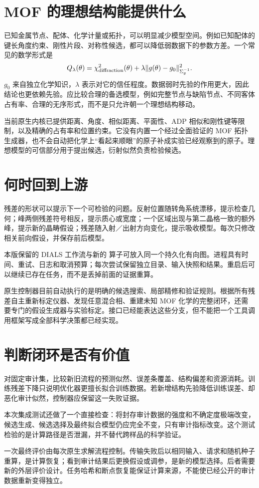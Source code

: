 \section{MOF 的理想结构能提供什么}
已知金属节点、配体、化学计量或拓扑，可以明显减少模型空间。例如已知配体的键长角度约束、刚性片段、对称性候选，都可以降低弱数据下的参数方差。一个常见的数学形式是
\begin{equation}
 Q_\lambda(\theta)=\chi^2_{\rm diffraction}(\theta)
                  +\lambda\|g(\theta)-g_0\|_{\Sigma_g^{-1}}^2.
\end{equation}
$g_0$ 来自独立化学知识，$\lambda$ 表示对它的信任程度。数据弱时先验的作用更大，因此结论也更依赖先验。应比较合理的备选模型，例如完整节点与缺陷节点、不同客体占有率、合理的无序形式，而不是只允许朝一个理想结构移动。

当前原生内核已提供距离、角度、相似距离、平面性、ADP 相似和刚性键等限制，以及精确的占有率和位置约束。它没有内置一个经过全面验证的 MOF 拓扑生成器，也不会自动把化学上“看起来顺眼”的原子补成实验已经观察到的原子。理想模型的可信部分用于提出候选，衍射似然负责检验候选。

\section{何时回到上游}
残差的形状可以提示下一个可检验的问题。反射位置随转角系统漂移，提示检查几何；峰两侧残差符号相反，提示质心或宽度；一个区域出现与第二晶格一致的额外峰，提示新的晶畴假设；残差随入射／出射方向变化，提示吸收模型。每次只修改相关前向假设，并保存前后模型。

本版保留的 DIALS 工作流与新的  算子可放入同一个持久化有向图。进程具有时间、重试、日志和取消预算；每次尝试保留独立目录、输入快照和结果。重启后可以继续已存在任务，而不是丢掉前面的证据重算。

原生控制器目前自动执行的是明确的候选搜索、局部精修和验证规则。根据所有残差自主重新标定仪器、发现任意混合相、重建未知 MOF 化学的完整闭环，还需要专门的假设生成器与实验标定。接口已经能表达这些分支，但不能把一个工具调用框架写成全部科学决策都已经实现。

\section{判断闭环是否有价值}
对固定审计集，比较新旧流程的预测似然、误差条覆盖、结构偏差和资源消耗。训练残差下降只说明优化器更擅长拟合训练数据。若新增结构先验降低训练误差、却恶化审计似然，控制器应保留这一失败证据。

本次集成测试还做了一个直接检查：将封存审计数据的强度和不确定度极端改变，候选生成、候选选择及最终拟合模型仍应完全不变，只有审计指标改变。这个测试检验的是计算路径是否泄漏，并不替代跨样品的科学验证。

一次最终评价由每次原生求解流程控制。传输失败后以相同输入、请求和随机种子重算，是计算恢复；看到审计结果后更换假设或调参，是新的模型选择。后者需要新的外层评价设计。任务哈希和断点恢复能保证计算来源，不能使已经公开的审计数据重新变得独立。
